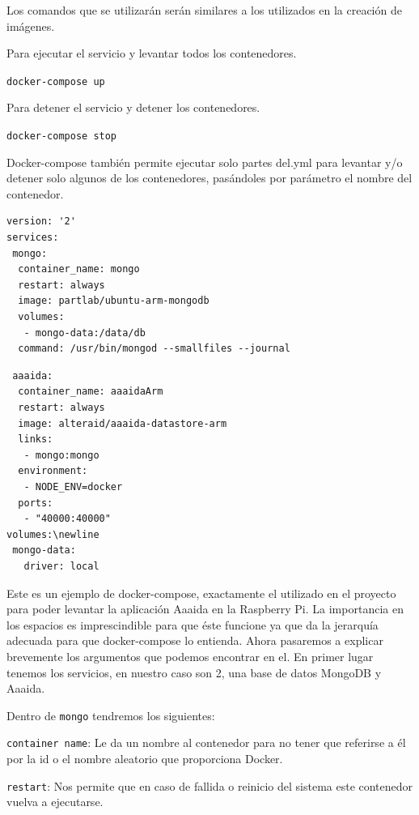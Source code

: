 Los comandos que se utilizarán serán similares a los utilizados en la creación de imágenes.

Para ejecutar el servicio y levantar todos los contenedores.

\begin{center}
\texttt{docker-compose up}
\end{center} 

Para detener el servicio y detener los contenedores.

\begin{center}
\texttt{docker-compose stop}
\end{center} 

Docker-compose también permite ejecutar solo partes del.yml para levantar y/o detener solo algunos de los contenedores, pasándoles por parámetro el nombre del contenedor.

\begin{center}
\begin{verbatim}
version: '2'
services:
 mongo:
  container_name: mongo
  restart: always
  image: partlab/ubuntu-arm-mongodb
  volumes:
   - mongo-data:/data/db
  command: /usr/bin/mongod --smallfiles --journal
  \end{verbatim}
\begin{verbatim}
 aaaida:
  container_name: aaaidaArm
  restart: always
  image: alteraid/aaaida-datastore-arm
  links:
   - mongo:mongo 
  environment:
   - NODE_ENV=docker
  ports:
   - "40000:40000"
volumes:\newline
 mongo-data:
   driver: local
\end{verbatim}
\end{center}

Este es un ejemplo de docker-compose, exactamente el utilizado en el proyecto para poder levantar la aplicación Aaaida en la Raspberry Pi. 
La importancia en los espacios es imprescindible para que éste funcione ya que da la jerarquía adecuada para que docker-compose lo entienda.
Ahora pasaremos a explicar brevemente los argumentos que podemos encontrar en el. 
En primer lugar tenemos los servicios, en nuestro caso son 2, una base de datos MongoDB y Aaaida.

Dentro de \texttt{mongo} tendremos los siguientes: 

\texttt{container name}: Le da un nombre al contenedor para no tener que referirse a él por la id o el nombre aleatorio que proporciona Docker.

\texttt{restart}: Nos permite que en caso de fallida o reinicio del sistema este contenedor vuelva a ejecutarse.

